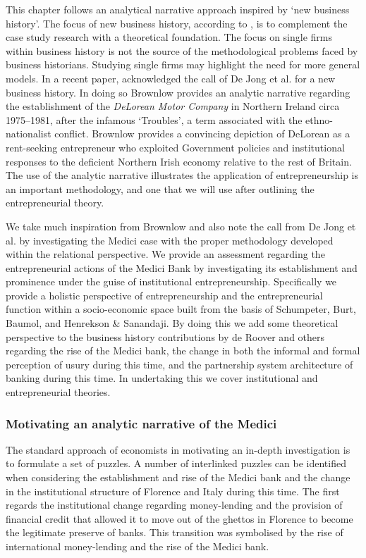
This chapter follows an analytical narrative approach inspired by `new business history'. The focus of new business history, according to \citet{JongHigginsDriel2015}, is to complement the case study research with a theoretical foundation. The focus on single firms within business history is not the source of the methodological problems faced by business historians. Studying single firms may highlight the need for more general models. In a recent paper, \citet{Brownlow2015} acknowledged the call of De Jong et al. for a new business history. In doing so Brownlow provides an analytic narrative regarding the establishment of the \emph{DeLorean Motor Company} in Northern Ireland circa 1975--1981, after the infamous `Troubles', a term associated with the ethno-nationalist conflict. Brownlow provides a convincing depiction of DeLorean as a rent-seeking entrepreneur who exploited Government policies and institutional responses to the deficient Northern Irish economy relative to the rest of Britain. The use of the analytic narrative illustrates the application of entrepreneurship is an important methodology, and one that we will use after outlining the entrepreneurial theory.

We take much inspiration from Brownlow and also note the call from De Jong et al. by investigating the Medici case with the proper methodology developed within the relational perspective. We provide an assessment regarding the entrepreneurial actions of the Medici Bank by investigating its establishment and prominence under the guise of institutional entrepreneurship. Specifically we provide a holistic perspective of entrepreneurship and the entrepreneurial function within a socio-economic space built from the basis of Schumpeter, Burt, Baumol, and Henrekson \& Sanandaji. By doing this we add some theoretical perspective to the business history contributions by de Roover and others regarding the rise of the Medici bank, the change in both the informal and formal perception of usury during this time, and the partnership system architecture of banking during this time. In undertaking this we cover institutional and entrepreneurial theories.

\subsubsection{Motivating an analytic narrative of the Medici}

The standard approach of economists in motivating an in-depth investigation is to formulate a set of puzzles. A number of interlinked puzzles can be identified when considering the establishment and rise of the Medici bank and the change in the institutional structure of Florence and Italy during this time. The first regards the institutional change regarding money-lending and the provision of financial credit that allowed it to move out of the ghettos in Florence to become the legitimate preserve of banks. This transition was symbolised by the rise of international money-lending and the rise of the Medici bank.

